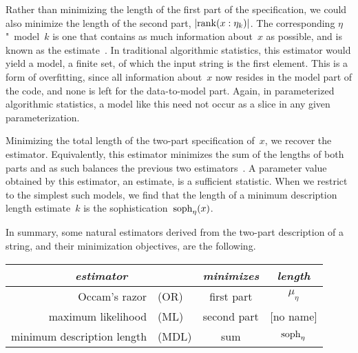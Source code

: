 Rather than minimizing the length of the first part of the specification, we could also minimize the length of the second part, ${\lvert\operatorname{rank}(x : \eta_k)\rvert}$.
The corresponding $\eta$"~model~$k$ is one that contains as much information about~$x$ as possible, and is known as the  estimate~\parencite{vereshchagin2004kolmogorov}.
In traditional algorithmic statistics, this estimator would yield a model, a finite set, of which the input string is the first element.
This is a form of overfitting, since all information about~$x$ now resides in the model part of the code, and none is left for the data-to-model part.
Again, in parameterized algorithmic statistics, a model like this need not occur as a slice in any given parameterization.

Minimizing the total length of the two-part specification of~$x$, we recover the  estimator.
Equivalently, this estimator minimizes the sum of the lengths of both parts and as such balances the previous two estimators~\parencite{vereshchagin2004kolmogorov,rissanen1983universal}.
A parameter value obtained by this estimator, an estimate, is a sufficient statistic.
When we restrict to the simplest such models, we find that the length of a minimum description length estimate~$k$ is the sophistication~$\operatorname{soph}_\eta(x)$.

In summary, some natural estimators derived from the two-part description of a string, and their minimization objectives, are the following.
\begin{center}
  \begin{tabular}{r@{ }lcc}
    \multicolumn{2}{c}{\emph{estimator}}	& \emph{minimizes}	& \emph{length} \\
    \hline
    Occam's razor&(OR)	& first part	& $\mu_\eta$ \\
    maximum likelihood&(ML)	& second part	& \footnotesize{[no name]} \\
    minimum description length&(MDL)	& sum	& $\operatorname{soph}_\eta$
  \end{tabular}
\end{center}

